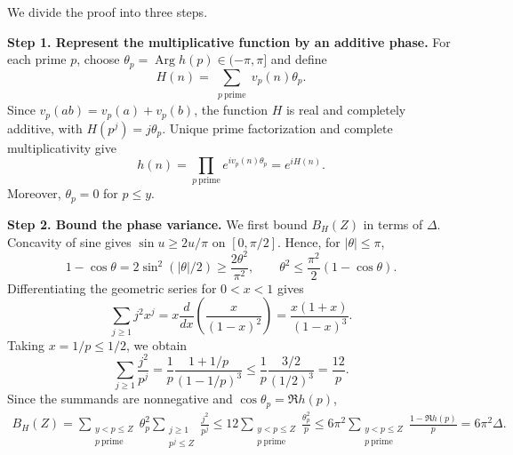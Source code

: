 \documentclass[twoside]{aomart}
\makeatletter
\theoremstyle{paperplain}
\theoremstyle{paperdefinition}
\renewenvironment{proof}[1][\proofname]{\par\pushQED{\qed}%
  \normalfont\topsep6\p@\@plus3\p@\relax\trivlist
  \item[\hskip\labelsep\itshape #1\@addpunct{.}]\ignorespaces
}{\popQED\endtrivlist\@endpefalse}
\numberwithin{equation}{section}
\makeatother
\begin{document}
\begin{proof}
We divide the proof into three steps.

\medskip
\noindent\textbf{Step 1. Represent the multiplicative function by an additive phase.}
For each prime $p$, choose
$\theta_p=\operatorname{Arg}h(p)\in(-\pi,\pi]$ and define
\begin{equation*}
 H(n)=\sum_{\substack{p\ \mathrm{prime}}} v_p(n)\theta_p.
 \end{equation*}
Since $v_p(ab)=v_p(a)+v_p(b)$, the function $H$ is real and
completely additive, with $H(p^j)=j\theta_p$.
Unique prime factorization and complete multiplicativity give
$$h(n)=\prod_{p\ \mathrm{prime}} e^{iv_p(n)\theta_p}=e^{iH(n)}.$$
Moreover, $\theta_p=0$ for $p\le y$.

\medskip
\noindent\textbf{Step 2. Bound the phase variance.}
We first bound $B_H(Z)$ in terms of $\Delta$.
Concavity of sine gives $\sin u\ge2u/\pi$ on $[0,\pi/2]$.
Hence, for $|\theta|\le\pi$,
\begin{equation*}
 1-\cos\theta=2\sin^2(|\theta|/2)
 \ge\frac{2\theta^2}{\pi^2},
 \qquad
 \theta^2\le\frac{\pi^2}{2}(1-\cos\theta).
 \end{equation*}
Differentiating the geometric series for $0<x<1$ gives
\begin{equation*}
 \sum_{j\ge1}j^2x^j
 =x\frac{d}{dx}\left(\frac{x}{(1-x)^2}\right)
 =\frac{x(1+x)}{(1-x)^3}.
 \end{equation*}
Taking $x=1/p\le1/2$, we obtain
\begin{equation*}
 \sum_{j\ge1}\frac{j^2}{p^j}
 =\frac1p\frac{1+1/p}{(1-1/p)^3}
 \le\frac1p\frac{3/2}{(1/2)^3}
 =\frac{12}{p}.
 \end{equation*}
Since the summands are nonnegative and $\cos\theta_p=\Re h(p)$,
\begin{equation}
 \begin{aligned}
 B_H(Z)
 =\sum_{\substack{y<p\le Z\\p\ \mathrm{prime}}}\theta_p^2
       \sum_{\substack{j\ge1\\p^j\le Z}}\frac{j^2}{p^j}
 \le12\sum_{\substack{y<p\le Z\\p\ \mathrm{prime}}}\frac{\theta_p^2}{p}
 \le6\pi^2\sum_{\substack{y<p\le Z\\p\ \mathrm{prime}}}\frac{1-\Re h(p)}p
 =6\pi^2\Delta.
 \end{aligned}
 \label{con:phase-variance-bound}
\end{equation}


\end{proof}
\end{document}
